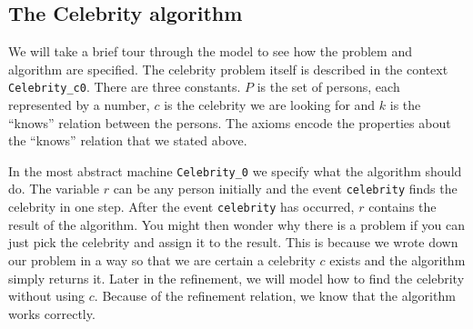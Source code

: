 {\begin{description}
\begin{description}
		\AnyPrm
			\begin{description}
			\end{description}
		\WhereGrd
			\begin{description}
			\nItemX{ grd1 }{ x \in  R }
			\nItemX{ grd2 }{ x \mapsto  b \notin  k }
			\end{description}
		\Witnesses
			\begin{description}
			\nItem{ y }{ b=y }
			\end{description}
		\ThenAct
			\begin{description}
			\nItemX{ act2 }{ b :=  x }
			\nItemX{ act1 }{ R :=  R \setminus  \{ x\}  }
			\end{description}
		\EndAct
		\end{description}
\END
\end{description}
}
\subsection{The Celebrity algorithm}
\label{the_celebrity_algorithm}

We will take a brief tour through the model to see how the problem and algorithm are specified.
The celebrity problem itself is described in the context \texttt{Celebrity\_c0}. There are
  three constants. $P$ is the set of persons, each represented by a number, $c$ is the celebrity
  we are looking for and $k$ is the ``knows'' relation between the persons.
The axioms encode the properties about the ``knows'' relation that we stated above.


In the most abstract machine \texttt{Celebrity\_0} we specify what the algorithm should do.
The variable $r$ can be any person initially and the event \texttt{celebrity} 
  finds the celebrity in one step. 
After the event \texttt{celebrity} has occurred, $r$ contains the result of the algorithm.
You might then wonder why there is a problem if you can just pick the celebrity and assign it to the result. This is because we wrote down our problem in a way so that we are certain a celebrity $c$ exists and the algorithm simply returns it.
Later in the refinement, we will model how to find the celebrity without using $c$.
Because of the refinement relation, we know that the algorithm works correctly.

